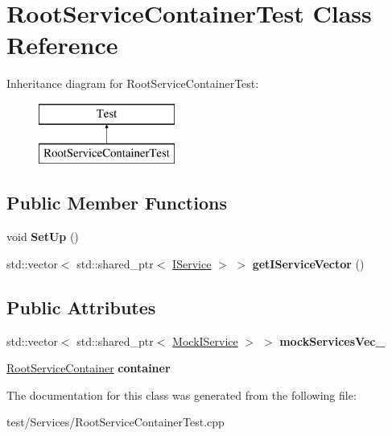 \hypertarget{classRootServiceContainerTest}{}\section{Root\+Service\+Container\+Test Class Reference}
\label{classRootServiceContainerTest}
Inheritance diagram for Root\+Service\+Container\+Test\+:\begin{figure}[H]
\begin{center}
\leavevmode
\includegraphics[height=2.000000cm]{classRootServiceContainerTest}
\end{center}
\end{figure}
\subsection*{Public Member Functions}
\begin{DoxyCompactItemize}
\item 
void {\bfseries Set\+Up} ()\hypertarget{classRootServiceContainerTest_abad6ce5b734cb854a6f2561752be6442}{}\label{classRootServiceContainerTest_abad6ce5b734cb854a6f2561752be6442}

\item 
std\+::vector$<$ std\+::shared\+\_\+ptr$<$ \hyperlink{classIService}{I\+Service} $>$ $>$ {\bfseries get\+I\+Service\+Vector} ()\hypertarget{classRootServiceContainerTest_a555a94a172dfe1fe4f6fe3e6d08ab8b6}{}\label{classRootServiceContainerTest_a555a94a172dfe1fe4f6fe3e6d08ab8b6}

\end{DoxyCompactItemize}
\subsection*{Public Attributes}
\begin{DoxyCompactItemize}
\item 
std\+::vector$<$ std\+::shared\+\_\+ptr$<$ \hyperlink{classMockIService}{Mock\+I\+Service} $>$ $>$ {\bfseries mock\+Services\+Vec\+\_\+}\hypertarget{classRootServiceContainerTest_ae1d3fe6286c84ddc59159268c9609a30}{}\label{classRootServiceContainerTest_ae1d3fe6286c84ddc59159268c9609a30}

\item 
\hyperlink{classRootServiceContainer}{Root\+Service\+Container} {\bfseries container}\hypertarget{classRootServiceContainerTest_a648fd71e336b4a44eb960dee80a861df}{}\label{classRootServiceContainerTest_a648fd71e336b4a44eb960dee80a861df}

\end{DoxyCompactItemize}


The documentation for this class was generated from the following file\+:\begin{DoxyCompactItemize}
\item 
test/\+Services/Root\+Service\+Container\+Test.\+cpp\end{DoxyCompactItemize}
